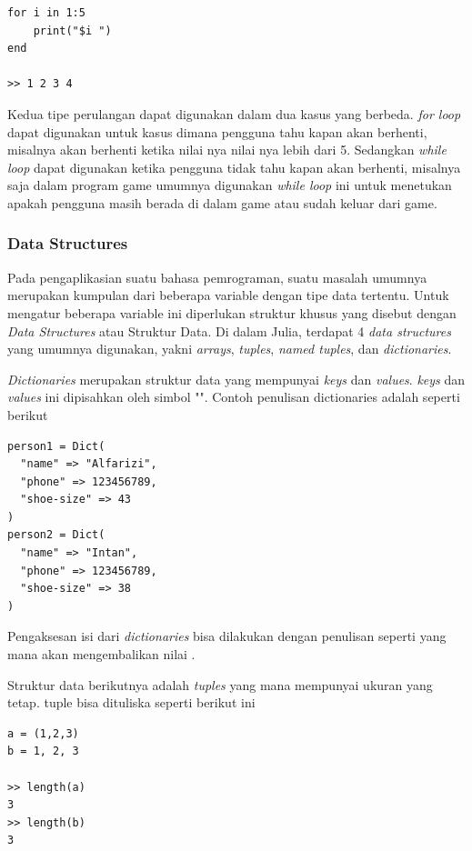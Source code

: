 \begin{lstlisting}
for i in 1:5
    print("$i ")
end

>> 1 2 3 4
\end{lstlisting}

\noindent
Kedua tipe perulangan dapat digunakan dalam dua kasus yang berbeda. \emph{for
loop} dapat digunakan untuk kasus dimana pengguna tahu kapan akan berhenti, misalnya
akan berhenti ketika nilai nya nilai nya lebih dari 5. Sedangkan \emph{while
loop} dapat digunakan ketika pengguna tidak tahu kapan akan berhenti, misalnya saja
dalam program game umumnya digunakan \emph{while loop} ini untuk menetukan
apakah pengguna masih berada di dalam game atau sudah keluar dari game.

\subsubsection{Data Structures}

Pada pengaplikasian suatu bahasa pemrograman, suatu masalah umumnya merupakan
kumpulan dari beberapa variable dengan tipe data tertentu. Untuk mengatur beberapa
variable ini diperlukan struktur khusus yang disebut dengan \emph{Data
Structures} atau Struktur Data. Di dalam Julia, terdapat 4 \emph{data structures}
yang umumnya digunakan, yakni \emph{arrays}, \emph{tuples}, \emph{named tuples},
dan \emph{dictionaries}.

\emph{Dictionaries} merupakan struktur data yang mempunyai \emph{keys} dan \emph{values}.
\emph{keys} dan \emph{values} ini dipisahkan oleh simbol "\cw{=>}". Contoh penulisan
dictionaries adalah seperti berikut

\begin{lstlisting}
person1 = Dict(
  "name" => "Alfarizi",
  "phone" => 123456789,
  "shoe-size" => 43
)
person2 = Dict(
  "name" => "Intan",
  "phone" => 123456789,
  "shoe-size" => 38
)
\end{lstlisting}

\noindent
Pengaksesan isi dari \emph{dictionaries} bisa dilakukan dengan penulisan seperti
 yang mana akan mengembalikan nilai .

Struktur data berikutnya adalah \emph{tuples} yang mana mempunyai ukuran yang tetap.
tuple bisa dituliska seperti berikut ini

\begin{lstlisting}
a = (1,2,3)
b = 1, 2, 3

>> length(a)
3
>> length(b)
3
\end{lstlisting}

